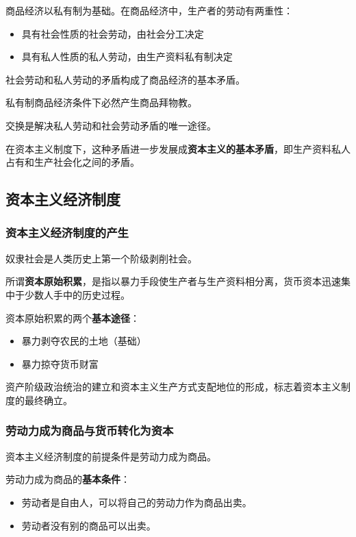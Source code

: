 \documentclass[12pt, a4paper, oneside]{ctexart}
\begin{document}
商品经济以私有制为基础。在商品经济中，生产者的劳动有两重性：
\begin{itemize}
  \item 具有社会性质的社会劳动，由社会分工决定
  \item 具有私人性质的私人劳动，由生产资料私有制决定
\end{itemize}

社会劳动和私人劳动的矛盾构成了商品经济的基本矛盾。

私有制商品经济条件下必然产生商品拜物教。

交换是解决私人劳动和社会劳动矛盾的唯一途径。

在资本主义制度下，这种矛盾进一步发展成\textbf{资本主义的基本矛盾}，即生产资料私人占有和生产社会化之间的矛盾。

\subsection{资本主义经济制度}

\subsubsection{资本主义经济制度的产生}

奴隶社会是人类历史上第一个阶级剥削社会。

所谓\textbf{资本原始积累}，是指以暴力手段使生产者与生产资料相分离，货币资本迅速集中于少数人手中的历史过程。

资本原始积累的两个\textbf{基本途径}：
\begin{itemize}
  \item 暴力剥夺农民的土地（基础）
  \item 暴力掠夺货币财富
\end{itemize}

资产阶级政治统治的建立和资本主义生产方式支配地位的形成，标志着资本主义制度的最终确立。

\subsubsection{劳动力成为商品与货币转化为资本}

资本主义经济制度的前提条件是劳动力成为商品。

劳动力成为商品的\textbf{基本条件}：
\begin{itemize}
  \item 劳动者是自由人，可以将自己的劳动力作为商品出卖。
  \item 劳动者没有别的商品可以出卖。
\end{itemize}
\end{document}
